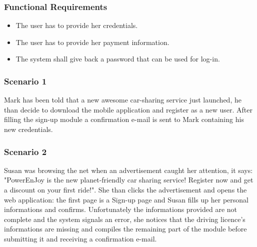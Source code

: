 \subsubsection{Functional Requirements}
\begin{itemize}
  \item The user has to provide her credentials. 
  \item The user has to provide her payment information.
  \item The system shall give back a password that can be used for log-in.
\end{itemize}
\subsubsection{Scenario 1}
Mark has been told that a new awesome car-sharing service just launched, he than decide to download the mobile application and register as a new user. After filling the sign-up module a confirmation e-mail is sent to Mark containing his new credentials.

\subsubsection{Scenario 2}
Susan was browsing the net when an advertisement caught her attention, it says: "PowerEnJoy is the new planet-friendly car sharing service! Register now and get a discount on your first ride!". She than clicks the advertisement and opens the web application: the first page is a Sign-up page and Susan fills up her personal informations and confirms. Unfortunately the informations provided are not complete and the system signals an error, she notices that the driving licence's informations are missing and compiles the remaining part of the module before submitting it and receiving a confirmation e-mail.

